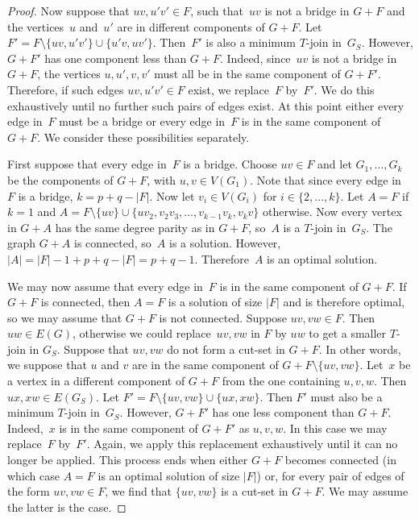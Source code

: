 \documentclass[11pt]{llncs}
\begin{document}
\begin{proof}
Now suppose that $uv,u'v'\in F$, such that~$uv$ is not a bridge in $G+F$ and
the vertices~$u$ and~$u'$ are in different components of $G+F$.
Let~$F'=F\setminus\{uv,u'v'\}\cup\{u'v,uv'\}$. Then~$F'$ is also a minimum
$T$-join in~$G_S$. However, $G+F'$ has one component less than $G+F$.  Indeed,
since~$uv$ is not a bridge in $G+F$, the vertices $u,u',v,v'$ must all be in
the same component of $G+F'$. Therefore, if such edges $uv,u'v'\in F$ exist, we
replace~$F$ by~$F'$. We do this exhaustively until no further such pairs of
edges exist. At this point either every edge in~$F$ must be a bridge or every
edge in~$F$ is in the same component of $G+F$. We consider these possibilities
separately.

First suppose that every edge in~$F$ is a bridge. Choose $uv \in F$ and let
$G_1,\ldots,G_k$ be the components of $G+F$, with $u,v \in V(G_1)$. Note that
since every edge in~$F$ is a bridge, $k=p+q-|F|$. Now let $v_i \in V(G_i)$ for
$i \in \{2,\ldots,k\}$. Let $A=F$ if $k=1$ and $A=F \setminus \{uv\} \cup
\{uv_2,v_2v_3,\ldots,v_{k-1}v_k,v_kv\}$ otherwise. Now every vertex in $G+A$
has the same degree parity as in $G+F$, so~$A$ is a $T$-join in~$G_S$.  The
graph $G+A$ is connected, so~$A$ is a solution.  However,
$|A|=|F|-1+p+q-|F|=p+q-1$.  Therefore~$A$ is an optimal solution.

We may now assume that every edge in~$F$ is in the same component of $G+F$. If
$G+F$ is connected, then $A=F$ is a solution of size $|F|$ and is therefore
optimal, so we may assume that $G+F$ is not connected. Suppose $uv,vw \in F$. Then
$uw \in E(G)$, otherwise we could replace~$uv,vw$ in $F$ by $uw$ to get a
smaller $T$-join in $G_S$. Suppose that $uv,vw$ do not form a cut-set in $G+F$.
In other words, we suppose that $u$ and $v$ are in the same component of
$G+F\setminus\{uv,vw\}$. Let~$x$ be a vertex in a different component of $G+F$
from the one containing $u,v,w$. Then $ux,xw \in E(G_S)$.  Let
$F'=F\setminus\{uv,vw\}\cup\{ux,xw\}$. Then $F'$ must also be a minimum
$T$-join in~$G_S$. However, $G+F'$ has one less component than $G+F$.
Indeed,~$x$ is in the same component of $G+F'$ as $u,v,w$. In this case we may
replace~$F$ by~$F'$. Again, we apply this replacement exhaustively until it can
no longer be applied. This process ends when either $G+F$ becomes connected (in
which case $A=F$ is an optimal solution of size $|F|$) or, for every pair of
edges of the form $uv,vw \in F$, we find that $\{uv,vw\}$ is a cut-set in
$G+F$. We may assume the latter is the case.


\end{proof}
\end{document}
